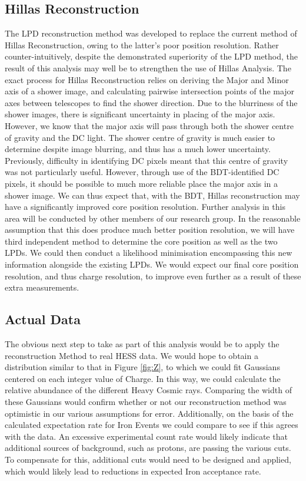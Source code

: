 \documentclass[11pt]{article}
\begin{document}
\subsection{Hillas Reconstruction}
The LPD reconstruction method was developed to replace the current method of Hillas Reconstruction, owing to the latter's poor position resolution. Rather counter-intuitively, despite the demonstrated superiority of the LPD method, the result of this analysis may well be to strengthen the use of Hillas Analysis. The exact process for Hillas Reconstruction relies on deriving the Major and Minor axis of a shower image, and calculating pairwise intersection points of the major axes between telescopes to find the shower direction. Due to the blurriness of the shower images, there is significant uncertainty in placing of the major axis. However, we know that the major axis will pass through both the shower centre of gravity and the DC light. The shower centre of gravity is much easier to determine despite image blurring, and thus has a much lower uncertainty. Previously, difficulty in identifying DC pixels meant that this centre of gravity was not particularly useful. However, through use of the BDT-identified DC pixels, it should be possible to much more reliable place the major axis in a shower image. We can thus expect that, with the BDT, Hillas reconstruction may have a significantly improved core position resolution. Further analysis in this area will be conducted by other members of our research group. In the reasonable assumption that this does produce much better position resolution, we will have third independent method to determine the core position as well as the two LPDs. We could then conduct a likelihood minimisation encompassing this new information alongside the existing LPDs. We would expect our final core position resolution, and thus charge resolution, to improve even further as a result of these extra measurements.

\subsection{Actual Data}
The obvious next step to take as part of this analysis would be to apply the reconstruction Method to real HESS data. We would hope to obtain a distribution similar to that in Figure \ref{fig:Z}, to which we could fit Gaussians centered on each integer value of Charge. In this way, we could calculate the relative abundance of the different Heavy Cosmic rays. Comparing the width of these Gaussians would confirm whether or not our reconstruction method was optimistic in our various assumptions for error. Additionally, on the basis of the calculated expectation rate for Iron Events we could compare to see if this agrees
with the data. An excessive experimental count rate would likely indicate that additional sources of background, such as protons, are passing the various cuts. To compensate for this, additional cuts would need to be designed and applied, which would likely lead to reductions in expected Iron acceptance rate.
\end{document}
